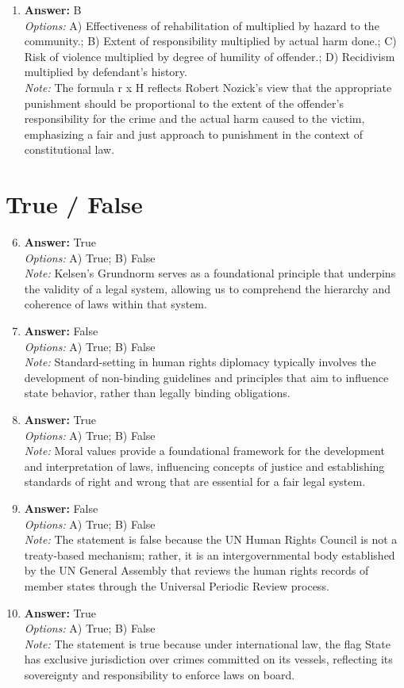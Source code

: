 \documentclass[12pt]{article}
\begin{document}
\begin{enumerate}[label=\arabic*.]
\item \textbf{Answer:} B
\\ \textit{Options:} A) Effectiveness of rehabilitation of multiplied by hazard to the community.; B) Extent of responsibility multiplied by actual harm done.; C) Risk of violence multiplied by degree of humility of offender.; D) Recidivism multiplied by defendant's history.
\\ \textit{Note:} The formula r x H reflects Robert Nozick's view that the appropriate punishment should be proportional to the extent of the offender's responsibility for the crime and the actual harm caused to the victim, emphasizing a fair and just approach to punishment in the context of constitutional law.
\end{enumerate}

\section*{True / False}
\begin{enumerate}[label=\arabic*.]
\setcounter{enumi}{5}
\item \textbf{Answer:} True
\\ \textit{Options:} A) True; B) False
\\ \textit{Note:} Kelsen's Grundnorm serves as a foundational principle that underpins the validity of a legal system, allowing us to comprehend the hierarchy and coherence of laws within that system.
\item \textbf{Answer:} False
\\ \textit{Options:} A) True; B) False
\\ \textit{Note:} Standard-setting in human rights diplomacy typically involves the development of non-binding guidelines and principles that aim to influence state behavior, rather than legally binding obligations.
\item \textbf{Answer:} True
\\ \textit{Options:} A) True; B) False
\\ \textit{Note:} Moral values provide a foundational framework for the development and interpretation of laws, influencing concepts of justice and establishing standards of right and wrong that are essential for a fair legal system.
\item \textbf{Answer:} False
\\ \textit{Options:} A) True; B) False
\\ \textit{Note:} The statement is false because the UN Human Rights Council is not a treaty-based mechanism; rather, it is an intergovernmental body established by the UN General Assembly that reviews the human rights records of member states through the Universal Periodic Review process.
\item \textbf{Answer:} True
\\ \textit{Options:} A) True; B) False
\\ \textit{Note:} The statement is true because under international law, the flag State has exclusive jurisdiction over crimes committed on its vessels, reflecting its sovereignty and responsibility to enforce laws on board.
\end{enumerate}
\end{document}
